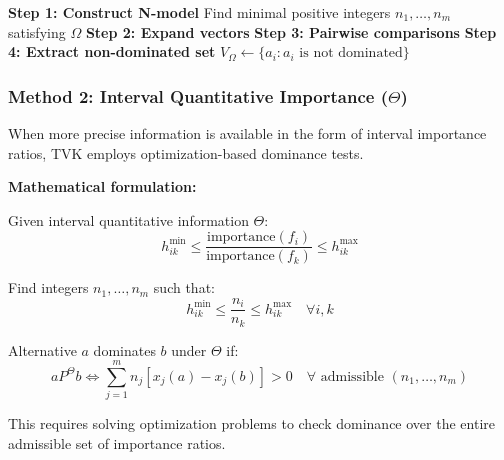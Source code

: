 \documentclass[conference]{IEEEtran}
\begin{document}
\begin{algorithm}
	\caption{TVK Method with Qualitative Importance ($\Omega$)}
	\label{alg:tvk_omega}
	\SetAlgoLined
	\textbf{Step 1: Construct N-model}\;
	Find minimal positive integers $n_1, \ldots, n_m$ satisfying $\Omega$\;
	\textbf{Step 2: Expand vectors}\;
	\textbf{Step 3: Pairwise comparisons}\;
	\textbf{Step 4: Extract non-dominated set}\;
	$V_\Omega \leftarrow \{a_i : a_i \text{ is not dominated}\}$\;
	\;
\end{algorithm}

\subsubsection{Method 2: Interval Quantitative Importance ($\Theta$)}

When more precise information is available in the form of interval importance ratios, TVK employs optimization-based dominance tests.

\textbf{Mathematical formulation:}

Given interval quantitative information $\Theta$:
\begin{equation}
	h_{ik}^{\min} \leq \frac{\text{importance}(f_i)}{\text{importance}(f_k)} \leq h_{ik}^{\max}
\end{equation}

Find integers $n_1, \ldots, n_m$ such that:
\begin{equation}
	h_{ik}^{\min} \leq \frac{n_i}{n_k} \leq h_{ik}^{\max} \quad \forall i,k
\end{equation}

Alternative $a$ dominates $b$ under $\Theta$ if:
\begin{equation}
	a P^\Theta b \iff \sum_{j=1}^m n_j [x_j(a) - x_j(b)] > 0 \quad \forall \text{ admissible } (n_1, \ldots, n_m)
\end{equation}

This requires solving optimization problems to check dominance over the entire admissible set of importance ratios.
\end{document}
